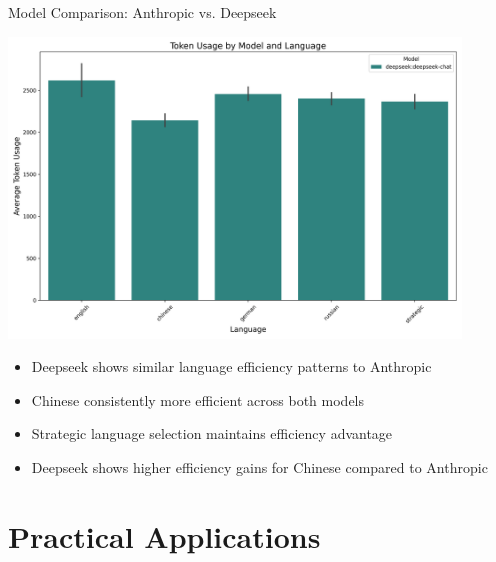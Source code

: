 \documentclass{beamer}
\begin{document}
\begin{frame}{Model Comparison: Anthropic vs. Deepseek}
    \begin{center}
        \includegraphics[width=0.9\textwidth]{visualizations/model_comparison/token_usage_by_model_language.png}
    \end{center}
    
    \begin{itemize}
        \item Deepseek shows similar language efficiency patterns to Anthropic
        \item Chinese consistently more efficient across both models
        \item Strategic language selection maintains efficiency advantage
        \item Deepseek shows higher efficiency gains for Chinese compared to Anthropic
    \end{itemize}
\end{frame}

\section{Practical Applications}
\end{document}
